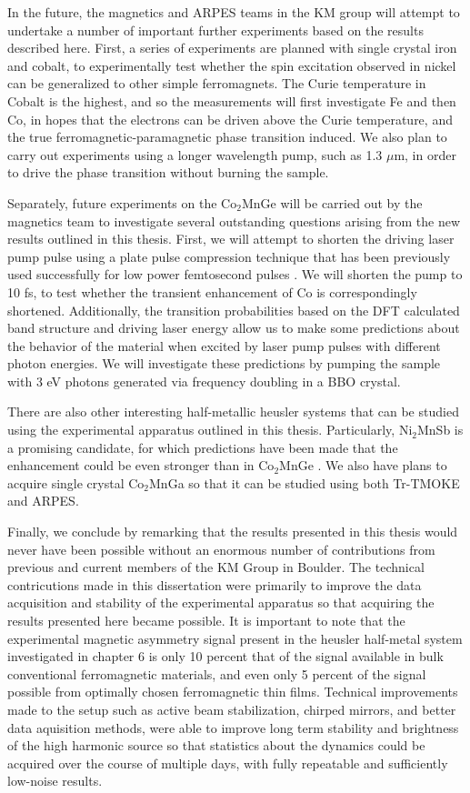 In the future, the magnetics and ARPES teams in the KM group will attempt to undertake a number of important further experiments based on the results described here. First, a series of experiments are planned with single crystal iron and cobalt, to experimentally test whether the spin excitation observed in nickel can be generalized to other simple ferromagnets. The Curie temperature in Cobalt is the highest, and so the measurements will first investigate Fe and then Co, in hopes that the electrons can be driven above the Curie temperature, and the true ferromagnetic-paramagnetic phase transition induced. We also plan to carry out experiments using a longer wavelength pump, such as 1.3 $\mu$m, in order to drive the phase transition without burning the sample.

Separately, future experiments on the Co$_2$MnGe will be carried out by the magnetics team to investigate several outstanding questions arising from the new results outlined in this thesis. First, we will attempt to shorten the driving laser pump pulse using a plate pulse compression technique that has been previously used successfully for low power femtosecond pulses \cite{Cheng2016}. We will shorten the pump to 10 fs, to test whether the transient enhancement of Co is correspondingly shortened. Additionally, the transition probabilities based on the DFT calculated band structure and driving laser energy allow us to make some predictions about the behavior of the material when excited by laser pump pulses with different photon energies. We will investigate these predictions by pumping the sample with 3 eV photons generated via frequency doubling in a BBO crystal.

There are also other interesting half-metallic heusler systems that can be studied using the experimental apparatus outlined in this thesis. Particularly, Ni$_2$MnSb is a promising candidate, for which predictions have been made that the enhancement could be even stronger than in Co$_2$MnGe \cite{Elliott2016}. We also have plans to acquire single crystal Co$_2$MnGa so that it can be studied using both Tr-TMOKE and ARPES.

Finally, we conclude by remarking that the results presented in this thesis would never have been possible without an enormous number of contributions from previous and current members of the KM Group in Boulder. The technical contricutions made in this dissertation were primarily to improve the data acquisition and stability of the experimental apparatus so that acquiring the results presented here became possible. It is important to note that the experimental magnetic asymmetry signal present in the heusler half-metal system investigated in chapter 6 is only 10 percent that of the signal available in bulk conventional ferromagnetic materials, and even only 5 percent of the signal possible from optimally chosen ferromagnetic thin films. Technical improvements made to the setup such as active beam stabilization, chirped mirrors, and better data aquisition methods, were able to improve long term stability and brightness of the high harmonic source so that statistics about the dynamics could be acquired over the course of multiple days, with fully repeatable and sufficiently low-noise results.

